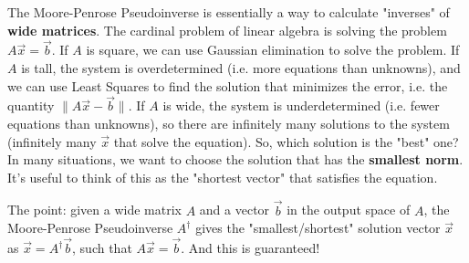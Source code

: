 

The Moore-Penrose Pseudoinverse is essentially a way to calculate "inverses" of \textbf{wide matrices}. The cardinal problem of linear algebra is solving the problem $A\vec{x} = \vec{b}$. If $A$ is square, we can use Gaussian elimination to solve the problem. If $A$ is tall, the system is overdetermined (i.e. more equations than unknowns), and we can use Least Squares to find the solution that minimizes the error, i.e. the quantity $\lVert A\vec{x} - \vec{b} \rVert$. If $A$ is wide, the system is underdetermined (i.e. fewer equations than unknowns), so there are infinitely many solutions to the system (infinitely many $\vec{x}$ that solve the equation). So, which solution is the "best" one? In many situations, we want to choose the solution that has the \textbf{smallest norm}. It's useful to think of this as the "shortest vector" that satisfies the equation.

The point: given a wide matrix $A$ and a vector $\vec{b}$ in the output space of $A$, the Moore-Penrose Pseudoinverse $A^\dagger$ gives the "smallest/shortest" solution vector $\vec{x}$ as $\vec{x} = A^\dagger \vec{b}$, such that $A\vec{x} = \vec{b}$. And this is guaranteed!

